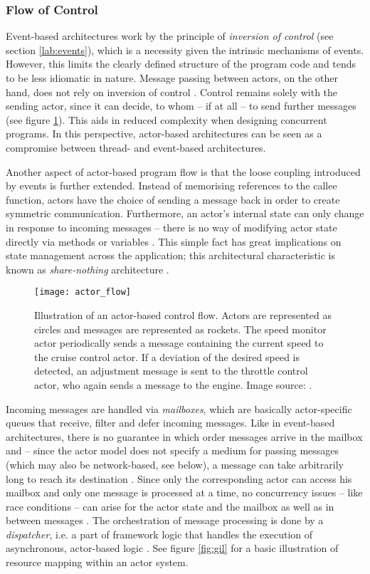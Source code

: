 \subsubsection*{Flow of Control}
Event-based architectures work by the principle of \textit{inversion of control} (see section \ref{lab:events}), which is a necessity given the intrinsic mechanisms of events. However, this limits the clearly defined structure of the program code and tends to be less idiomatic in nature. Message passing between actors, on the other hand, does not rely on inversion of control \cite{Haller2006}. Control remains solely with the sending actor, since it can decide, to whom -- if at all -- to send further messages (see figure \ref{fig:actor_flow}). This aids in reduced complexity when designing concurrent programs. In this perspective, actor-based architectures can be seen as a compromise between thread- and event-based architectures.

Another aspect of actor-based program flow is that the loose coupling introduced by events is further extended. Instead of memorising references to the callee function, actors have the choice of sending a message back in order to create symmetric communication. Furthermore, an actor's internal state can only change in response to incoming messages -- there is no way of modifying actor state directly via methods or variables \cite[p. 38]{Haller2011}. This simple fact has great implications on state management across the application; this architectural characteristic is known as \textit{share-nothing} architecture \cite[p. 3]{Bonetta}.

\begin{figure}
\centering\small
\setlength{\tabcolsep}{0mm}
  \texttt{[image: actor\_flow]}
\caption{
Illustration of an actor-based control flow. Actors are represented as circles and messages are represented as rockets. The speed monitor actor periodically sends a message containing the current speed to the cruise control actor. If a deviation of the desired speed is detected, an adjustment message is sent to the throttle control actor, who again sends a message to the engine. Image source: \cite{Haller2011}.
}
\label{fig:actor_flow}
\end{figure}

Incoming messages are handled via \textit{mailboxes}, which are basically actor-specific queues that receive, filter and defer incoming messages. Like in event-based architectures, there is no guarantee in which order messages arrive in the mailbox and -- since the actor model does not specify a medium for passing messages (which may also be network-based, see below), a message can take arbitrarily long to reach its destination \cite[97]{Erb2012}. Since only the corresponding actor can access his mailbox and only one message is processed at a time, no concurrency issues -- like race conditions -- can arise for the actor state and the mailbox as well as in between messages \cite[p. 12]{Eriksson2013}. The orchestration of message processing is done by a \textit{dispatcher}, i.e. a part of framework logic that handles the execution of asynchronous, actor-based logic \cite[p. 97]{Gupta2012}. See figure \ref{fig:gil} for a basic illustration of resource mapping within an actor system.

